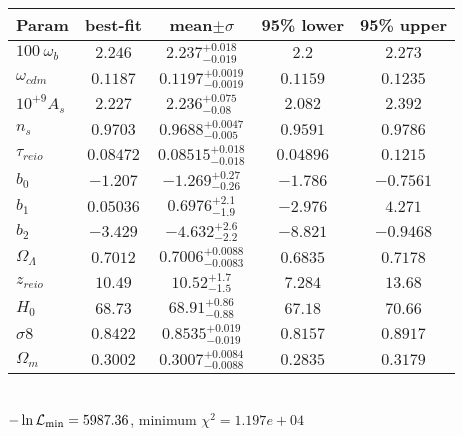 \begin{tabular}{|l|c|c|c|c|} 
 \hline 
Param & best-fit & mean$\pm\sigma$ & 95\% lower & 95\% upper \\ \hline 
$100~\omega_{b }$ &$2.246$ & $2.237_{-0.019}^{+0.018}$ & $2.2$ & $2.273$ \\ 
$\omega_{cdm }$ &$0.1187$ & $0.1197_{-0.0019}^{+0.0019}$ & $0.1159$ & $0.1235$ \\ 
$10^{+9}A_{s }$ &$2.227$ & $2.236_{-0.08}^{+0.075}$ & $2.082$ & $2.392$ \\ 
$n_{s }$ &$0.9703$ & $0.9688_{-0.005}^{+0.0047}$ & $0.9591$ & $0.9786$ \\ 
$\tau_{reio }$ &$0.08472$ & $0.08515_{-0.018}^{+0.018}$ & $0.04896$ & $0.1215$ \\ 
$b_{0 }$ &$-1.207$ & $-1.269_{-0.26}^{+0.27}$ & $-1.786$ & $-0.7561$ \\ 
$b_{1 }$ &$0.05036$ & $0.6976_{-1.9}^{+2.1}$ & $-2.976$ & $4.271$ \\ 
$b_{2 }$ &$-3.429$ & $-4.632_{-2.2}^{+2.6}$ & $-8.821$ & $-0.9468$ \\ 
$\Omega_{\Lambda }$ &$0.7012$ & $0.7006_{-0.0083}^{+0.0088}$ & $0.6835$ & $0.7178$ \\ 
$z_{reio }$ &$10.49$ & $10.52_{-1.5}^{+1.7}$ & $7.284$ & $13.68$ \\ 
$H_{0 }$ &$68.73$ & $68.91_{-0.88}^{+0.86}$ & $67.18$ & $70.66$ \\ 
$\sigma8$ &$0.8422$ & $0.8535_{-0.019}^{+0.019}$ & $0.8157$ & $0.8917$ \\ 
$\Omega_{m }$ &$0.3002$ & $0.3007_{-0.0088}^{+0.0084}$ & $0.2835$ & $0.3179$ \\ 
\hline 
 \end{tabular} \\ 
$-\ln{\cal L}_\mathrm{min} =5987.36$, minimum $\chi^2=1.197e+04$ \\ 
